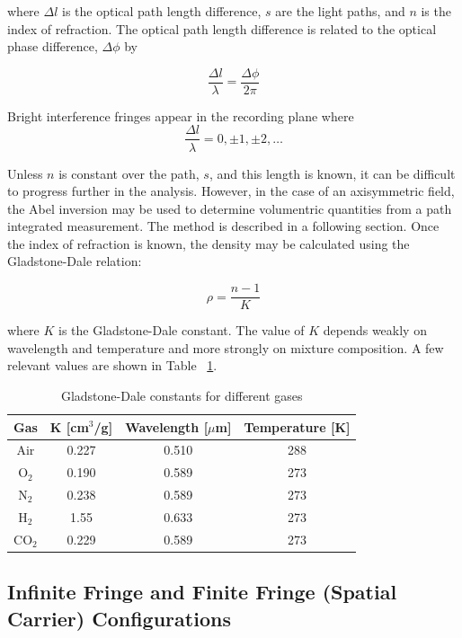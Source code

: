 \documentclass[11pt]{article} %
\begin{document}
where $\Delta l$ is the optical path length difference, $s$ are the light paths, and $n$ is the index of refraction. The optical path length difference is related to the optical phase difference, $\Delta \phi$ by

\begin{equation}
	\frac{\Delta l}{\lambda}= \frac{\Delta \phi}{2 \pi}
	\label{eq:pathphase}
\end{equation}

Bright interference fringes appear in the recording plane where
\begin{equation}
	\frac{\Delta l}{\lambda} = 0, \pm 1, \pm 2, \dots
	\label{eq:fringes}
\end{equation}

Unless $n$ is constant over the path, $s$, and this length is known, it can be difficult to progress further in the analysis. However, in the case of an axisymmetric field, the Abel inversion may be used to determine volumentric quantities from a path integrated measurement. The method is described in a following section. Once the index of refraction is known, the density may be calculated using the Gladstone-Dale relation:

\begin{equation}
	\rho = \frac{n-1}{K}
	\label{eq:gladstone}
\end{equation}

where $K$ is the Gladstone-Dale constant. The value of $K$ depends weakly on wavelength and temperature and more strongly on mixture composition. A few relevant values are shown in Table ~\ref{tab:gladstone}.

\begin{table}
	\centering
	\begin{tabular}{c c c c}
		Gas & K [cm$^3$/g]& Wavelength [$\mu$m] & Temperature [K] \\ \hline
		Air & 0.227 & 0.510 & 288 \\
		O$_2$ & 0.190 & 0.589 & 273 \\
		N$_2$ & 0.238 & 0.589 & 273 \\
		H$_2$ & 1.55 & 0.633 & 273 \\
		CO$_2$ & 0.229 & 0.589 & 273 \\ \hline
	\end{tabular}
	\caption{Gladstone-Dale constants for different gases}
	\label{tab:gladstone}
\end{table}




\subsection{Infinite Fringe and Finite Fringe (Spatial Carrier) Configurations}
\end{document}
